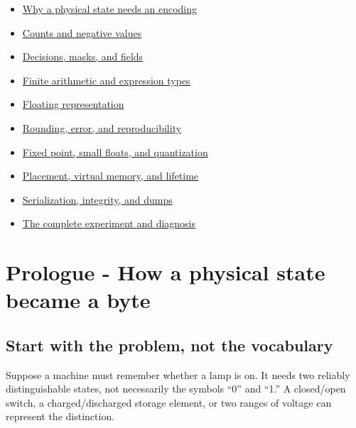 \begin{itemize}
\tightlist
\item
  \hyperref[01-foundations-i-ch001-prologue---how-a-physical-state-became-a-byte]{Why a physical state needs an encoding}
\item
  \hyperref[01-foundations-i-ch001-from-a-signal-to-an-interpretation]{Counts and negative values}
\item
  \hyperref[01-foundations-i-ch001-bits-become-decisions-and-compact-fields]{Decisions, masks, and fields}
\item
  \hyperref[01-foundations-i-ch001-arithmetic-becomes-a-policy]{Finite arithmetic and expression types}
\item
  \hyperref[01-foundations-i-ch001-a-stretching-ruler-for-real-valued-quantities]{Floating representation}
\item
  \hyperref[01-foundations-i-ch001-when-arithmetic-meets-uncertainty]{Rounding, error, and reproducibility}
\item
  \hyperref[01-foundations-i-ch001-choosing-what-information-to-keep]{Fixed point, small floats, and quantization}
\item
  \hyperref[01-foundations-i-ch002-where-the-bytes-live]{Placement, virtual memory, and lifetime}
\item
  \hyperref[01-foundations-i-ch002-bytes-become-a-durable-agreement]{Serialization, integrity, and dumps}
\item
  \hyperref[01-foundations-i-ch002]{The complete experiment and diagnosis}
\end{itemize}

\section{Prologue - How a physical state became a byte}\label{01-foundations-i-ch001-prologue---how-a-physical-state-became-a-byte}

\subsection{Start with the problem, not the vocabulary}\label{01-foundations-i-ch001-start-with-the-problem-not-the-vocabulary}

Suppose a machine must remember whether a lamp is on. It needs two reliably distinguishable states, not necessarily the symbols ``0'' and ``1.'' A closed/open switch, a charged/discharged storage element, or two ranges of voltage can represent the distinction.

